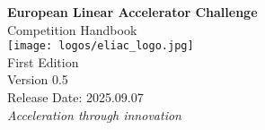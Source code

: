 
\begin{titlepage}
    \centering
    \vspace*{2cm}
    {\Huge\bfseries European Linear Accelerator Challenge\\[0.5cm]}
    {\LARGE Competition Handbook\\[2cm]}
    \texttt{[image: logos/eliac\_logo.jpg]}\\[2cm]
    {\Large First Edition\\[2cm]}
    {\Large Version 0.5\\[0.5cm]}
    {\large Release Date: 2025.09.07\\[2cm]}
    \vfill
    {\large\textit{Acceleration through innovation}}\\[0.5cm]
\end{titlepage}